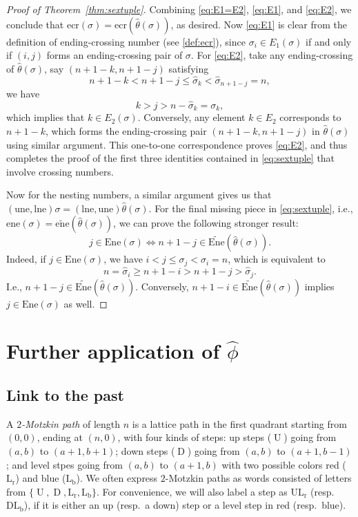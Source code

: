 \documentclass[12pt,reqno]{amsart}
\numberwithin{equation}{section}
\theoremstyle{plain}
\theoremstyle{definition}
\def\ecr{\mathrm{ecr}}
\def\une{\mathrm{une}}
\def\ene{\mathrm{ene}}
\def\lne{\mathrm{lne}}
\def\wene{\widetilde{\mathrm{ene}}}
\def\Ene{\mathrm{Ene}}
\def\Wene{\widetilde{\mathrm{Ene}}}
\def\Ene{\mathrm{Ene}}
\def\rU{\operatorname{U}}
\def\rD{\operatorname{D}}
\def\rLr{\operatorname{L_r}}
\def\rLb{\operatorname{L_b}}
\def\ULr{\operatorname{UL_r}}
\def\DLb{\operatorname{DL_b}}
\begin{document}
\begin{proof}[Proof of Theorem~\ref{thm:sextuple}]
Combining \eqref{eq:E1=E2}, \eqref{eq:E1}, and \eqref{eq:E2}, we conclude that $\ecr(\sigma)=\ecr(\hat{\theta}(\sigma))$, as desired. Now \eqref{eq:E1} is clear from the definition of ending-crossing number (see \eqref{def:ecr}), since $\sigma_i\in E_1(\sigma)$ if and only if $(i,j)$ forms an ending-crossing pair of $\sigma$. For \eqref{eq:E2}, take any ending-crossing of $\hat{\theta}(\sigma)$, say $(n+1-k,n+1-j)$ satisfying
$$n+1-k<n+1-j\le \hat{\sigma}_k<\hat{\sigma}_{n+1-j}=n,$$
we have
$$k>j>n-\hat{\sigma}_k=\sigma_k,$$
which implies that $k\in E_2(\sigma)$. Conversely, any element $k\in E_2$ corresponds to $n+1-k$, which forms the ending-crossing pair $(n+1-k,n+1-j)$ in $\hat{\theta}(\sigma)$ using similar argument. This one-to-one correspondence proves \eqref{eq:E2}, and thus completes the proof of the first three identities contained in \eqref{eq:sextuple} that involve crossing numbers.

Now for the nesting numbers, a similar argument gives us that $(\une,\lne)\sigma=(\lne,\une)\hat{\theta}(\sigma)$. For the final missing piece in \eqref{eq:sextuple}, i.e., $\ene(\sigma)=\wene(\hat{\theta}(\sigma))$, we can prove the following stronger result:
$$j\in \Ene(\sigma)\Longleftrightarrow n+1-j\in \Wene(\hat{\theta}(\sigma)).$$
Indeed, if $j\in\Ene(\sigma)$, we have $i<j\le\sigma_j<\sigma_i=n$, which is equivalent to
$$n=\hat{\sigma}_i\ge n+1-i>n+1-j>\hat{\sigma}_j.$$
I.e., $n+1-j\in\Wene(\hat{\theta}(\sigma))$. Conversely, $n+1-i\in\Wene(\hat{\theta}(\sigma))$ implies $j\in\Ene(\sigma)$ as well.
\end{proof}




\section{Further application of \texorpdfstring{$\widehat\phi$}{widehat-phi}}\label{sec:baxter}

\subsection{Link to the past} 
A \emph{$2$-Motzkin path} of length $n$ is a lattice path in the first quadrant starting from $(0,0)$, ending at $(n,0)$, with four kinds of steps: up steps ($\rU$) going from $(a,b)$ to $(a+1,b+1)$; down steps ($\rD$) going from $(a,b)$ to $(a+1,b-1)$; and level stpes going from $(a,b)$ to $(a+1,b)$ with two possible colors red ($\rLr$) and blue ($\rLb$). We often express $2$-Motzkin paths as words consisted of letters from $\{\rU,\rD,\rLr,\rLb\}$. For convenience, we will also label a step as $\ULr$ (resp.~$\DLb$), if it is either an up (resp.~a down) step or a level step in red (resp.~blue). 
\end{document}
